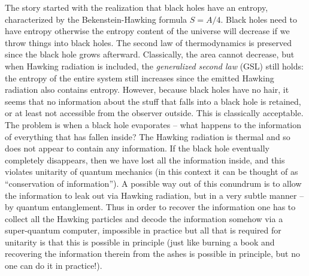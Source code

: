 \documentclass[preprintnumbers, floatfix, preprintnumbers, letterpaper, twocolumn, superscriptaddress,nofootinbib]{revtex4-2}
\begin{document}
The story started with the realization that black holes have an entropy, characterized by the Bekenstein-Hawking formula $S=A/4$. Black holes need to have entropy otherwise the entropy content of the universe will decrease if we throw things into black holes. The second law of thermodynamics is preserved since the black hole grows afterward. Classically, the area cannot decrease, but when Hawking radiation is included, the \emph{generalized second law} (GSL) still holds: the entropy of the entire system still increases since the emitted Hawking radiation also contains entropy. However, because black holes have no hair, it seems that no information about the stuff that falls into a black hole is retained, or at least not accessible from the observer outside. This is classically acceptable. The problem is when a black hole evaporates -- what happens to the information of everything that has fallen inside? The Hawking radiation is thermal and so does not appear to contain any information. If the black hole eventually completely disappears, then we have lost all the information inside, and this violates unitarity of quantum mechanics (in this context it can be thought of as ``conservation of information''). A possible way out of this conundrum is to allow the information to leak out via Hawking radiation, but in a very subtle manner -- by quantum entanglement. Thus in order to recover the information one has to collect all the Hawking particles and decode the information somehow via a super-quantum computer, impossible in practice but all that is required for unitarity is that this is possible in principle (just like burning a book and recovering the information therein from the ashes is possible in principle, but no one can do it in practice!). 
\end{document}
